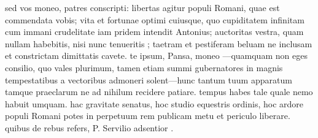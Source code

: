  sed vos moneo, patres conscripti: libertas agitur populi Romani, quae est commendata vobis; vita et fortunae optimi cuiusque, quo cupiditatem infinitam cum immani crudelitate iam pridem intendit Antonius; auctoritas vestra, quam nullam habebitis, nisi nunc tenueritis ; taetram et pestiferam beluam ne inclusam et constrictam dimittatis cavete. te ipsum, Pansa, moneo —quamquam non eges consilio, quo vales plurimum, tamen etiam summi gubernatores in magnis tempestatibus a vectoribus admoneri solent—hunc tantum tuum apparatum tamque praeclarum ne ad nihilum recidere patiare. tempus habes tale quale nemo habuit umquam. hac gravitate senatus, hoc studio equestris ordinis, hoc ardore populi Romani potes in perpetuum rem publicam metu et periculo liberare. quibus de rebus refers, P. Servilio adsentior .
